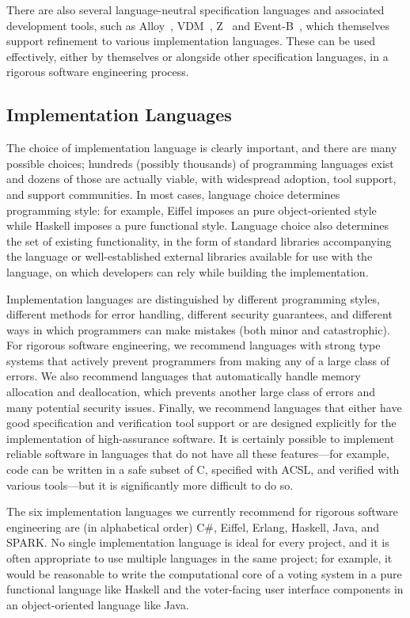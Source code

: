 There are also several language-neutral specification languages and
associated development tools, such as Alloy~\cite{Alloy},
VDM~\cite{VDM}, Z~\cite{Zed} and Event-B~\cite{Abrial10}, which
themselves support refinement to various implementation
languages. These can be used effectively, either by themselves or
alongside other specification languages, in a rigorous software
engineering process. 

\subsection{Implementation Languages}

The choice of implementation language is clearly important, and there
are many possible choices; hundreds (possibly thousands) of
programming languages exist and dozens of those are actually viable,
with widespread adoption, tool support, and support communities. In
most cases, language choice determines programming style: for example,
Eiffel imposes an pure object-oriented style while Haskell imposes a
pure functional style. Language choice also determines the set of
existing functionality, in the form of standard libraries accompanying
the language or well-established external libraries available for use
with the language, on which developers can rely while building the
implementation. 

Implementation languages are distinguished by different programming
styles, different methods for error handling, different security
guarantees, and different ways in which programmers can make mistakes
(both minor and catastrophic). For rigorous software engineering, we
recommend languages with strong type systems that actively prevent
programmers from making any of a large class of errors. We also
recommend languages that automatically handle memory allocation and
deallocation, which prevents another large class of errors and many
potential security issues. Finally, we recommend languages that either
have good specification and verification tool support or are designed
explicitly for the implementation of high-assurance software. It is
certainly possible to implement reliable software in languages that do
not have all these features---for example, code can be written in a
safe subset of C, specified with ACSL, and verified with various
tools---but it is significantly more difficult to do so.

The six implementation languages we currently recommend for rigorous
software engineering are (in alphabetical order) C\#, Eiffel, Erlang,
Haskell, Java, and SPARK. No
single implementation language is ideal for every project, and it is
often appropriate to use multiple languages in the same project; for
example, it would be reasonable to write the computational core of a
voting system in a pure functional language like Haskell and the
voter-facing user interface components in an object-oriented language
like Java.

